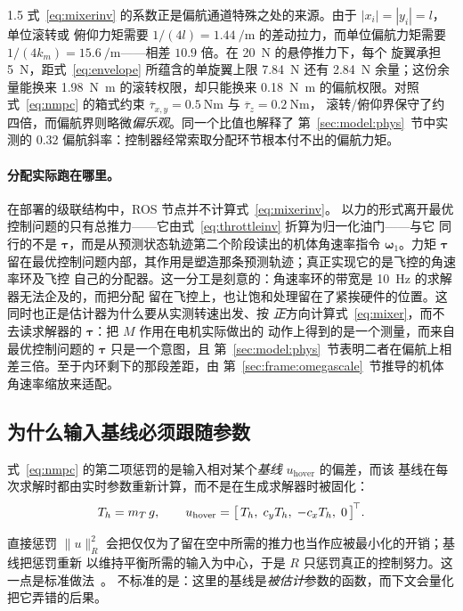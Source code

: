 \begin{spacing}{1.5}
式~\eqref{eq:mixerinv} 的系数正是偏航通道特殊之处的来源。由于 $|x_i| = |y_i| = l$，单位滚转或
俯仰力矩需要 $1/(4l) = \SI{1.44}{\per\meter}$ 的差动拉力，而单位偏航力矩需要
$1/(4k_m) = \SI{15.6}{\per\meter}$——相差 $10.9$ 倍。在 \SI{20}{\newton} 的悬停推力下，每个
旋翼承担 \SI{5}{\newton}，距式~\eqref{eq:envelope} 所蕴含的单旋翼上限 \SI{7.84}{\newton} 还有
\SI{2.84}{\newton} 余量；这份余量能换来 \SI{1.98}{\newton\meter} 的滚转权限，却只能换来
\SI{0.18}{\newton\meter} 的偏航权限。对照式~\eqref{eq:nmpc} 的箱式约束
$\overline\tau_{x,y} = \SI{0.5}{\newton\meter}$ 与 $\overline\tau_z = \SI{0.2}{\newton\meter}$，
滚转/俯仰界保守了约四倍，而偏航界则略微\emph{偏乐观}。同一个比值也解释了
第~\ref{sec:model:phys}~节中实测的 $0.32$ 偏航斜率：控制器经常索取分配环节根本付不出的偏航力矩。

\paragraph{分配实际跑在哪里。}在部署的级联结构中，ROS 节点并不计算式~\eqref{eq:mixerinv}。
以力的形式离开最优控制问题的只有总推力——它由式~\eqref{eq:throttleinv} 折算为归一化油门——与它
同行的不是 $\bm\tau$，而是从预测状态轨迹第二个阶段读出的机体角速率指令 $\bm\omega_1$。力矩
$\bm\tau$ 留在最优控制问题内部，其作用是塑造那条预测轨迹；真正实现它的是飞控的角速率环及飞控
自己的分配器。这一分工是刻意的：角速率环的带宽是 \SI{10}{\hertz} 的求解器无法企及的，而把分配
留在飞控上，也让饱和处理留在了紧挨硬件的位置。这同时也正是估计器为什么要从实测转速出发、按
\emph{正}方向计算式~\eqref{eq:mixer}，而不去读求解器的 $\bm\tau$：把 $M$ 作用在电机实际做出的
动作上得到的是一个测量，而来自最优控制问题的 $\bm\tau$ 只是一个意图，且
第~\ref{sec:model:phys}~节表明二者在偏航上相差三倍。至于内环剩下的那段差距，由
第~\ref{sec:frame:omegascale}~节推导的机体角速率缩放来适配。

\subsection{为什么输入基线必须跟随参数}\label{sec:model:hover}

式~\eqref{eq:nmpc} 的第二项惩罚的是输入相对某个\emph{基线} $u_{\mathrm{hover}}$ 的偏差，而该
基线在每次求解时都由实时参数重新计算，而不是在生成求解器时被固化：
\begin{equation}
T_h = m_T\, g,
\qquad
u_{\mathrm{hover}} = \bigl[\, T_h,\; c_y T_h,\; -c_x T_h,\; 0 \,\bigr]^{\!\top}.
\label{eq:hover}
\end{equation}

直接惩罚 $\|u\|^2_R$ 会把仅仅为了留在空中所需的推力也当作应被最小化的开销；基线把惩罚重新
以维持平衡所需的输入为中心，于是 $R$ 只惩罚真正的控制努力。这一点是标准做法~\cite{rawlings2017mpc}。
不标准的是：这里的基线是\emph{被估计}参数的函数，而下文会量化把它弄错的后果。


\end{spacing}
